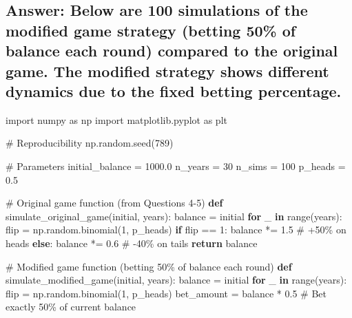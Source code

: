 \documentclass[
  letterpaper,
  DIV=11,
  numbers=noendperiod]{scrartcl}
\newenvironment{Shaded}{\begin{snugshade}}{\end{snugshade}}
\newcommand{\BuiltInTok}[1]{\textcolor[rgb]{0.00,0.23,0.31}{#1}}
\newcommand{\CommentTok}[1]{\textcolor[rgb]{0.37,0.37,0.37}{#1}}
\newcommand{\ControlFlowTok}[1]{\textcolor[rgb]{0.00,0.23,0.31}{\textbf{#1}}}
\newcommand{\DecValTok}[1]{\textcolor[rgb]{0.68,0.00,0.00}{#1}}
\newcommand{\FloatTok}[1]{\textcolor[rgb]{0.68,0.00,0.00}{#1}}
\newcommand{\ImportTok}[1]{\textcolor[rgb]{0.00,0.46,0.62}{#1}}
\newcommand{\KeywordTok}[1]{\textcolor[rgb]{0.00,0.23,0.31}{\textbf{#1}}}
\newcommand{\NormalTok}[1]{\textcolor[rgb]{0.00,0.23,0.31}{#1}}
\newcommand{\OperatorTok}[1]{\textcolor[rgb]{0.37,0.37,0.37}{#1}}
\theoremstyle{definition}
\theoremstyle{remark}
\begin{document}
\subsection{Answer: Below are 100 simulations of the modified game
strategy (betting 50\% of balance each round) compared to the original
game. The modified strategy shows different dynamics due to the fixed
betting
percentage.}\label{answer-below-are-100-simulations-of-the-modified-game-strategy-betting-50-of-balance-each-round-compared-to-the-original-game.-the-modified-strategy-shows-different-dynamics-due-to-the-fixed-betting-percentage.}

\begin{Shaded}
\begin{Highlighting}[]
\ImportTok{import}\NormalTok{ numpy }\ImportTok{as}\NormalTok{ np}
\ImportTok{import}\NormalTok{ matplotlib.pyplot }\ImportTok{as}\NormalTok{ plt}

\CommentTok{\# Reproducibility}
\NormalTok{np.random.seed(}\DecValTok{789}\NormalTok{)}

\CommentTok{\# Parameters}
\NormalTok{initial\_balance }\OperatorTok{=} \FloatTok{1000.0}
\NormalTok{n\_years }\OperatorTok{=} \DecValTok{30}
\NormalTok{n\_sims }\OperatorTok{=} \DecValTok{100}
\NormalTok{p\_heads }\OperatorTok{=} \FloatTok{0.5}

\CommentTok{\# Original game function (from Questions 4{-}5)}
\KeywordTok{def}\NormalTok{ simulate\_original\_game(initial, years):}
\NormalTok{    balance }\OperatorTok{=}\NormalTok{ initial}
    \ControlFlowTok{for}\NormalTok{ \_ }\KeywordTok{in} \BuiltInTok{range}\NormalTok{(years):}
\NormalTok{        flip }\OperatorTok{=}\NormalTok{ np.random.binomial(}\DecValTok{1}\NormalTok{, p\_heads)}
        \ControlFlowTok{if}\NormalTok{ flip }\OperatorTok{==} \DecValTok{1}\NormalTok{:}
\NormalTok{            balance }\OperatorTok{*=} \FloatTok{1.5}  \CommentTok{\# +50\% on heads}
        \ControlFlowTok{else}\NormalTok{:}
\NormalTok{            balance }\OperatorTok{*=} \FloatTok{0.6}   \CommentTok{\# {-}40\% on tails}
    \ControlFlowTok{return}\NormalTok{ balance}

\CommentTok{\# Modified game function (betting 50\% of balance each round)}
\KeywordTok{def}\NormalTok{ simulate\_modified\_game(initial, years):}
\NormalTok{    balance }\OperatorTok{=}\NormalTok{ initial}
    \ControlFlowTok{for}\NormalTok{ \_ }\KeywordTok{in} \BuiltInTok{range}\NormalTok{(years):}
\NormalTok{        flip }\OperatorTok{=}\NormalTok{ np.random.binomial(}\DecValTok{1}\NormalTok{, p\_heads)}
\NormalTok{        bet\_amount }\OperatorTok{=}\NormalTok{ balance }\OperatorTok{*} \FloatTok{0.5}  \CommentTok{\# Bet exactly 50\% of current balance}
        

\end{Highlighting}
\end{Shaded}
\end{document}
